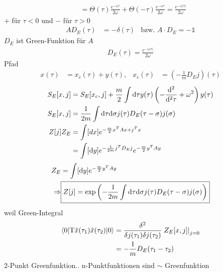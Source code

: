 \begin{enumerate}[1)]
\begin{align*}
				&= \Theta(\tau) \frac{e^{-\omega \tau}}{2 \omega} 
				+ \Theta (-\tau) \frac{e^{-\omega \tau}}{2 \omega} = \frac{e^{-\omega|\tau|}}{2 \omega}
			\end{align*}
			$+$ für $\tau < 0$ und $-$ für $\tau > 0$
			\begin{align*}
				A D_E(\tau) &= -\delta(\tau) & 
				\text{bzw. } A \cdot D_E = - \mathds{1} 
			\end{align*}
			$D_E$ ist Green-Funktion für $A$
			\begin{align*}
				\boxed{D_E (\tau) = \frac{e^{-\omega|\tau|}}{2 \omega}}
			\end{align*}
			Pfad 
			\begin{align*}
				x(\tau) &= x_c(\tau) + y(\tau) ,& x_c(\tau) &= \left(-\frac{1}{m} D_E j\right) (\tau)
			\end{align*}
			\begin{align*}
				S_E[x, j] &= S_E [x_c ,j]
				+ \frac{m}{2} \int \mathrm{d} \tau y (\tau) \left(-\frac{\mathrm{d}^2}{\mathrm{d}^2 \tau} + \omega^2\right)y(\tau) \\
				S_E[x , j] &= \frac{1}{2m} \int \mathrm{d} \tau \mathrm{d} \sigma 
				j(\tau) D_E (\tau - \sigma) j(\sigma) \\
				Z[j] Z_E &= \int [dx] e^{-\frac{m}{2} x^T A x + j^T x}  \\
				&= \int[\mathrm{d} y] e^{-\frac{1}{2m} j^T D_E j} e^{-\frac{m}{2} y^T A y}
			\end{align*}
			\begin{align*}
				Z_E &= \int [\mathrm{d} y] e^{-\frac{m}{2} y^T A y} \\
			\Rightarrow &
			\boxed{
					Z[j] = \exp \left(
						-\frac{1}{2 m} \int \mathrm{d} \tau \mathrm{d} \sigma j(\tau) D_E (\tau - \sigma) j(\sigma)
					\right)
				}
			\end{align*}
			weil Green-Integral
			\begin{align*}
			\braket{0 | \mathrm{T} \hat{x} (\tau_1) \hat{x}(\tau_2)| 0} &=
			\frac{\delta^2}{\delta j(\tau_1) \delta j(\tau_2)} \left.Z_E[x, j]\right|_{j = 0}\\
			&= -\frac{1}{m} D_E (\tau_1 - \tau_2) 
			\end{align*}
			2-Punkt Greenfunktion.. n-Punktfunktionen sind $\sim$ Greenfunktion
	\end{enumerate}